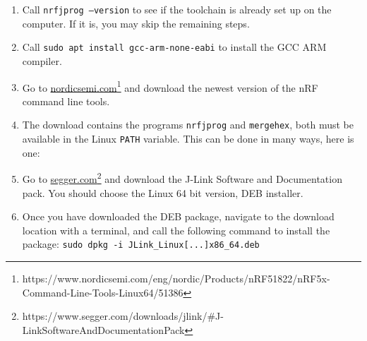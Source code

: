 \documentclass[11pt,a4paper]{article}
\begin{document}
\begin{enumerate}
\item Call \texttt{nrfjprog --version} to see if the toolchain is already set up on the computer. If it is, you may skip the remaining steps.
\item Call \texttt{sudo apt install gcc-arm-none-eabi} to install the GCC ARM compiler.
\item Go to \href{https://www.nordicsemi.com/eng/nordic/Products/nRF51822/nRF5x-Command-Line-Tools-Linux64/51386}{nordicsemi.com}\footnote{https://www.nordicsemi.com/eng/nordic/Products/nRF51822/nRF5x-Command-Line-Tools-Linux64/51386} and download the newest version of the nRF command line tools.
\item The download contains the programs \texttt{nrfjprog} and \texttt{mergehex}, both must be available in the Linux \texttt{PATH} variable. This can be done in many ways, here is one:
\item Go to \href{https://www.segger.com/downloads/jlink/\#J-LinkSoftwareAndDocumentationPack}{segger.com}\footnote{https://www.segger.com/downloads/jlink/\#J-LinkSoftwareAndDocumentationPack} and download the J-Link Software and Documentation pack. You should choose the Linux 64 bit version, DEB installer.
\item Once you have downloaded the DEB package, navigate to the download location with a terminal, and call the following command to install the package: \texttt{sudo dpkg -i JLink_Linux[...]x86_64.deb}
\end{enumerate}
\end{document}
